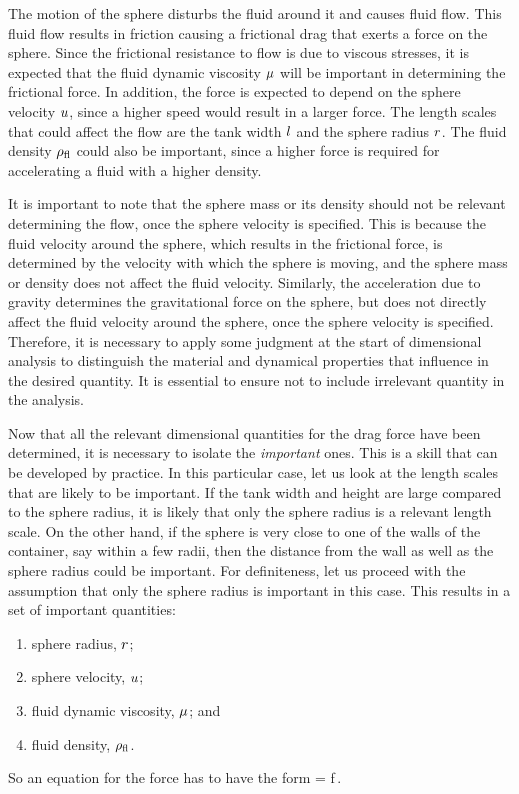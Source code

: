 \begin{solution}
The motion of the sphere disturbs the fluid around it and causes fluid flow. This fluid flow results in friction causing a frictional drag that exerts a force on the sphere. Since the frictional resistance to flow is due to viscous stresses, it is expected that the fluid dynamic viscosity $\mu$ will be important in determining the frictional force. In addition, the force is expected to depend on the sphere velocity $u$, since a higher speed would result in a larger force. The length scales that could affect the flow are the tank width $l$ and the sphere radius $r$. The fluid density $\rho_\text{fl}$ could also be important, since a higher force is required for accelerating a fluid with a higher density.

It is important to note that the sphere mass or its density should not be relevant determining the flow, once the sphere velocity is specified. This is because the fluid velocity around the sphere, which results in the frictional force, is determined by the velocity with which the sphere is moving, and the sphere mass or density does not affect the fluid velocity. Similarly, the acceleration due to gravity determines the gravitational force on the sphere, but does not directly affect the fluid velocity around the sphere, once the sphere velocity is specified. Therefore, it is necessary to apply some judgment at the start of dimensional analysis to distinguish the material and dynamical properties that influence in the desired quantity. It is essential to ensure not to include irrelevant quantity in the analysis.

Now that all the relevant dimensional quantities for the drag force have been determined, it is necessary to isolate the \emph{important} ones. This is a skill that can be developed by practice. In this particular case, let us look at the length scales that are likely to be important. If the tank width and height are large compared to the sphere radius, it is likely that only the sphere radius is a relevant length scale. On the other hand, if the sphere is very close to one of the walls of the container, say within a few radii, then the distance from the wall as well as the sphere radius could be important. For definiteness, let us proceed with the assumption that only the sphere radius is important in this case. This results in a set of important quantities:
\begin{enumerate}
\item sphere radius, $r$; 
\item sphere velocity, $u$;
\item fluid dynamic viscosity, $\mu$; and 
\item fluid density, $\rho_\text{fl}$.
\end{enumerate}
So an equation for the force has to have the form
\beq
\drag = f\,.
\eeq


\end{solution}
